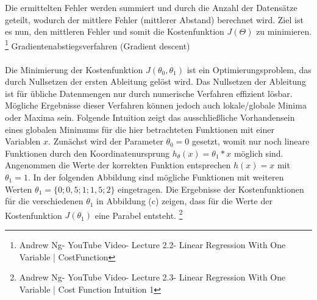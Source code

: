 \documentclass[a4paper]{scrreprt}
\begin{document}
\begin{enumerate}
Die ermittelten Fehler werden summiert und durch die Anzahl der Datensätze geteilt, wodurch der mittlere Fehler (mittlerer Abstand) berechnet wird. Ziel ist es nun, den mittleren Fehler und somit die Kostenfunktion $J(\Theta)$ zu minimieren.
\footnote{Andrew Ng- YouTube Video- Lecture 2.2- Linear Regression With One Variable | CostFunction}
\newpage
%
Gradientenabstiegsverfahren (Gradient descent)\\\\
Die Minimierung der Kostenfunktion $J(\theta_{0},\theta_{1})$ ist ein Optimierungsproblem, das durch Nullsetzen der ersten Ableitung gelöst wird. Das Nullsetzen der Ableitung ist für übliche Datenmengen nur durch numerische Verfahren effizient lösbar. Mögliche Ergebnisse dieser Verfahren können jedoch  auch lokale/globale Minima oder Maxima sein. Folgende Intuition zeigt das ausschließliche Vorhandensein eines globalen Minimums für die hier betrachteten Funktionen mit einer Variablen $x$. Zunächst wird der Parameter $\theta_{0}=0$ gesetzt, womit nur noch lineare Funktionen durch den Koordinatenursprung $h_{\theta}(x)=%
\theta_{1}*x$ möglich sind. Angenommen die Werte der korrekten Funktion entsprechen $h(x)=x$ mit $\theta_{1}=1$. In der folgenden Abbildung sind mögliche Funktionen mit weiteren Werten $\theta_{1}=\{0; 0,5; 1; 1,5; 2\}$ eingetragen. Die Ergebnisse der Kostenfunktionen für die verschiedenen $\theta_{1}$ in Abbildung (c) zeigen, dass für die Werte der Kostenfunktion $J(\theta_{1})$ eine Parabel entsteht.
\footnote{Andrew Ng- YouTube Video- Lecture 2.3- Linear Regression With One Variable | Cost Function Intuition 1}
\begin{figure}[h]
\centering
{}

\end{figure}
\end{enumerate}
\end{document}
